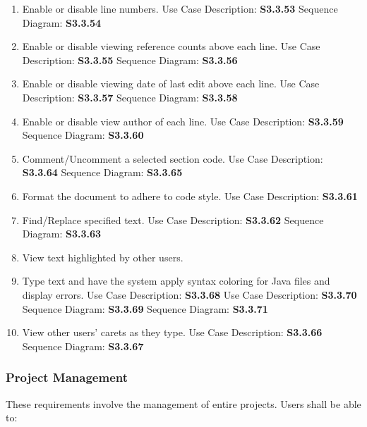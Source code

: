 \documentclass[twoside,letterpaper]{article}
\begin{document}
{\begin{enumerate}
	\item Enable or disable line numbers.
		\subitem Use Case Description: \textbf{S3.3.53}
		\subitem Sequence Diagram: \textbf{S3.3.54}
	\item Enable or disable viewing reference counts above each line.
		\subitem Use Case Description: \textbf{S3.3.55}
		\subitem Sequence Diagram: \textbf{S3.3.56}
	\item Enable or disable viewing date of last edit above each line.
		\subitem Use Case Description: \textbf{S3.3.57}
		\subitem Sequence Diagram: \textbf{S3.3.58}
	\item Enable or disable view author of each line.
		\subitem Use Case Description: \textbf{S3.3.59}
		\subitem Sequence Diagram: \textbf{S3.3.60}
	\item Comment/Uncomment a selected section code.
		\subitem Use Case Description: \textbf{S3.3.64}
		\subitem Sequence Diagram: \textbf{S3.3.65}
	\item Format the document to adhere to code style.
		\subitem Use Case Description: \textbf{S3.3.61}
	\item Find/Replace specified text.
		\subitem Use Case Description: \textbf{S3.3.62}
		\subitem Sequence Diagram: \textbf{S3.3.63}
	\item View text highlighted by other users.
	\item Type text and have the system apply syntax coloring for Java files and display errors.
		\subitem Use Case Description: \textbf{S3.3.68}
		\subitem Use Case Description: \textbf{S3.3.70}
		\subitem Sequence Diagram: \textbf{S3.3.69}
		\subitem Sequence Diagram: \textbf{S3.3.71}
	\item View other users' carets as they type.
		\subitem Use Case Description: \textbf{S3.3.66}
		\subitem Sequence Diagram: \textbf{S3.3.67}
\end{enumerate}

\subsubsection{Project Management}

These requirements involve the management of entire projects. Users shall be able to:

}
\end{document}
